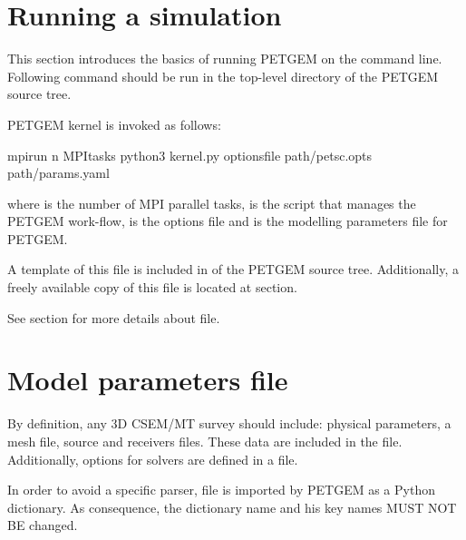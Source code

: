 \documentclass[letterpaper,10pt,english]{sphinxmanual}
\begin{document}
\section{Running a simulation}
\label{\detokenize{Tutorial:running-a-simulation}}\label{\detokenize{Tutorial:running-a-simulation-tutorial}}
This section introduces the basics of running PETGEM on the command
line. Following command should be run in the top-level directory of the PETGEM
source tree.

PETGEM kernel is invoked as follows:

\begin{sphinxVerbatim}[commandchars=\\\{\}]
\PYGZdl{} mpirun \PYGZhy{}n MPI\PYGZus{}tasks python3 kernel.py \PYGZhy{}options\PYGZus{}file path/petsc.opts path/params.yaml
\end{sphinxVerbatim}

where  is the number of MPI parallel tasks,  is
the script that manages the PETGEM work-flow,  is the
 options file and 
is the modelling parameters file for PETGEM.

A template of this file is included in 
of the PETGEM source tree. Additionally, a freely available copy of this file
is located at {\hyperref[\detokenize{Download:download}]{}} section.

See {\hyperref[\detokenize{Tutorial:model-parameters-file}]{}} section for more details about
 file.


\section{Model parameters file}
\label{\detokenize{Tutorial:model-parameters-file}}\label{\detokenize{Tutorial:id5}}
By definition, any 3D CSEM/MT survey should include: physical parameters, a mesh
file, source and receivers files. These data are included in the
 file. Additionally, options for
 solvers are defined in a
 file.

In order to avoid a specific parser,  file is imported by
PETGEM as a Python dictionary. As consequence, the dictionary name and his key names
MUST NOT BE changed.
\end{document}
